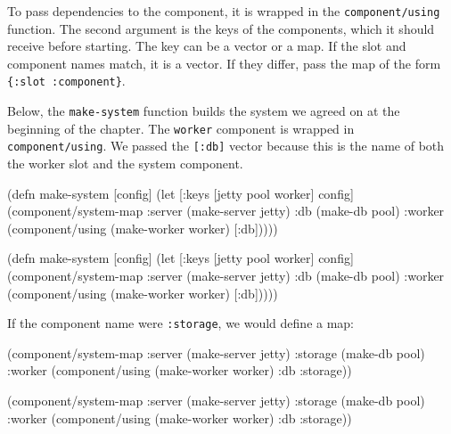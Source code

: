 To pass dependencies to the component, it is wrapped in the \verb|component/using| function. The second argument is the keys of the components, which it should receive before starting. The key can be a vector or a map. If the slot and component names match, it is a vector. If they differ, pass the map of the form \verb|{:slot :component}|.

Below, the \verb|make-system| function builds the system we agreed on at the beginning of the chapter. The \verb|worker| component is wrapped in \verb|component/using|. We passed the \verb|[:db]| vector because this is the name of both the worker slot and the system component.

\ifnarrow

\begin{english}
  \begin{clojure}
(defn make-system
  [config]
  (let [{:keys [jetty pool worker]}
        config]
    (component/system-map
     :server (make-server jetty)
     :db     (make-db pool)
     :worker (component/using
               (make-worker worker)
               [:db]))))
  \end{clojure}
\end{english}

\else

\begin{english}
  \begin{clojure}
(defn make-system
  [config]
  (let [{:keys [jetty pool worker]} config]
    (component/system-map
     :server (make-server jetty)
     :db     (make-db pool)
     :worker (component/using
              (make-worker worker) [:db]))))
  \end{clojure}
\end{english}

\fi


\noindent
If the component name were \verb|:storage|, we would define a map:

\ifnarrow

\begin{english}
  \begin{clojure}
(component/system-map
 :server  (make-server jetty)
 :storage (make-db pool)
 :worker  (component/using
            (make-worker worker)
            {:db :storage}))
  \end{clojure}
\end{english}

\else

\begin{english}
  \begin{clojure}
(component/system-map
 :server  (make-server jetty)
 :storage (make-db pool)
 :worker  (component/using
           (make-worker worker) {:db :storage}))
  \end{clojure}
\end{english}

